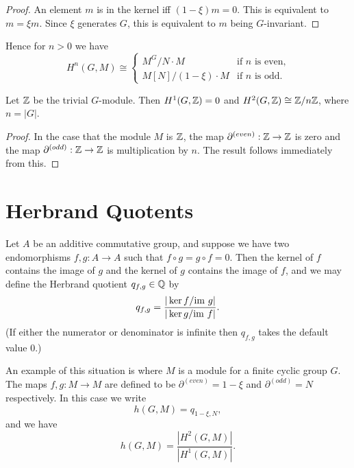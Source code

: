 \begin{proof}
  An element $m$ is in the kernel iff $(1-\xi)m=0$.
  This is equivalent to $m=\xi m$. Since $\xi$ generates $G$, this is
  equivalent to $m$ being $G$-invariant.
\end{proof}

Hence for $n > 0$ we have
\[
  H^n(G,M) \cong \begin{cases}
    M^G / N\cdot M & \text{if $n$ is even,}\\
    M[N] / (1-\xi) \cdot M & \text{if $n$ is odd.}
  \end{cases}
\]

\begin{theorem}\label{cyclic group cohomology with values in Z}
  Let ${\mathbb Z}$ be the trivial $G$-module.
  Then $H^1(G,{\mathbb Z})=0$ and $H^2(G,{\mathbb Z}) \cong {\mathbb Z}/n{\mathbb Z}$, where $n = |G|$.
\end{theorem}

\begin{proof}
  In the case that the module $M$ is ${\mathbb Z}$, the map $\partial^{(even)} : {\mathbb Z} \to {\mathbb Z}$ is zero
  and the map $\partial^{(odd)} : {\mathbb Z}\to {\mathbb Z}$ is multiplication by $n$.
  The result follows immediately from this.
\end{proof}


\section{Herbrand Quotents}

Let $A$ be an additive commutative group, and suppose we have two endomorphisms
$f,g : A \to A$ such that $f \circ g = g \circ f = 0$.
Then the kernel of $f$ contains the image of $g$ and the kernel of $g$ contains the image of $f$,
and we may define the Herbrand quotient $q_{f,g} \in {\mathbb Q}$ by
\[
  q_{f,g} = \frac{| \ker f / \mathrm{im}\  g|}{| \ker g / \mathrm{im}\  f|}.
\]
(If either the numerator or denominator is infinite then $q_{f,g}$ takes the default value $0$.)

An example of this situation is where $M$ is a module for a finite cyclic group $G$.
The maps $f,g : M \to M$ are defined to be $\partial^{(even)} = 1-\xi$ and $\partial^{(odd)} = N$
respectively.
In this case we write
\[
  h(G,M) = q_{1-\xi,N},
\]
and we have
\[
  h(G,M) = \frac{|H^2(G,M)|}{|H^1(G,M)|}.
\]

